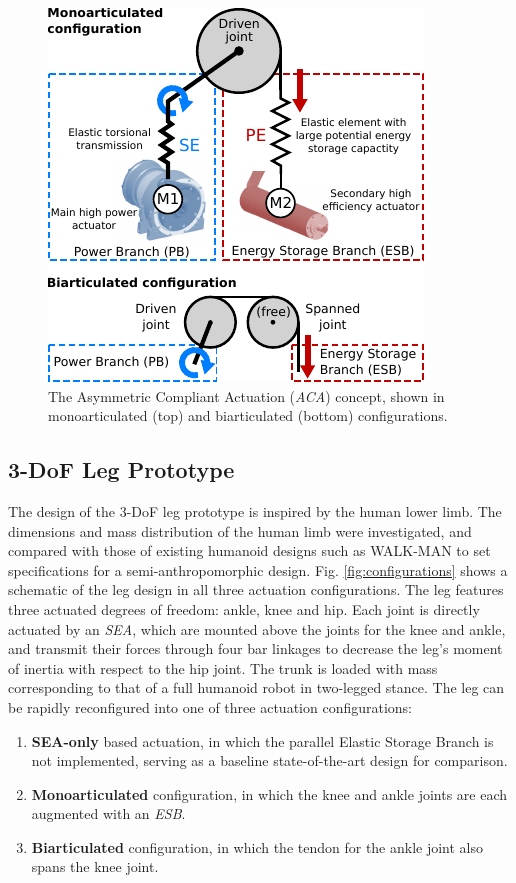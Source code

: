\documentclass[letterpaper, 10 pt, conference]{ieeeconf}  %
\begin{document}
\begin{figure}[ht]
	\centering
	\includegraphics[width=0.75\linewidth]{actuationConcept}
	\caption{The Asymmetric Compliant Actuation (\textit{ACA}) concept, shown in monoarticulated (top) and biarticulated (bottom) configurations.}
	\label{fig:ACA}
\end{figure}

\subsection{3-DoF Leg Prototype}
The design of the 3-DoF leg prototype is inspired by the human lower limb. The dimensions and mass distribution of the human limb were investigated, and compared with those of existing humanoid designs such as WALK-MAN \cite{tsagarakis2017walk} to set specifications for a semi-anthropomorphic design. Fig. \ref{fig:configurations} shows a schematic of the leg design in all three actuation configurations. The leg features three actuated degrees of freedom: ankle, knee and hip. Each joint is directly actuated by an \textit{SEA}, which are mounted above the joints for the knee and ankle, and transmit their forces through four bar linkages to decrease the leg’s moment of inertia with respect to the hip joint. The trunk is loaded with mass corresponding to that of a full humanoid robot in two-legged stance. The leg can be rapidly reconfigured into one of three actuation configurations:

\begin{enumerate}
	\item \textbf{SEA-only} based actuation, in which the parallel Elastic Storage Branch is not implemented, serving as a baseline state-of-the-art design for comparison.
	\item \textbf{Monoarticulated} configuration, in which the knee and ankle joints are each augmented with an \textit{ESB}.
	\item \textbf{Biarticulated} configuration, in which the tendon for the ankle joint also spans the knee joint.
\end{enumerate}
\end{document}

